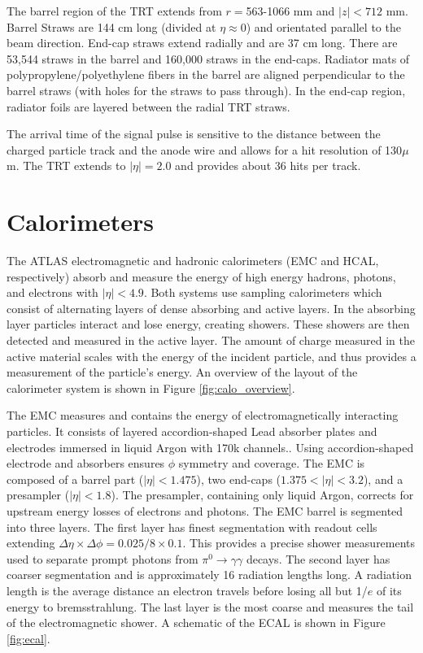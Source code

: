 The barrel region of the TRT extends from $r=$563-1066 mm and $|z| < 712$ mm. Barrel Straws are 144 cm long (divided  at $\eta \approx 0$) and orientated parallel to the beam direction. End-cap straws extend radially and are 37 cm long. There are 53,544 straws in the barrel and 160,000 straws in the end-caps. Radiator mats of polypropylene/polyethylene fibers in the barrel are aligned perpendicular to the barrel straws (with holes for the straws to pass through). In the end-cap region, radiator foils are layered between the radial TRT straws. 

The arrival time of the signal pulse is sensitive to the distance between the charged particle track and the anode wire and allows for a hit resolution of 130$\mu$m. The TRT extends to $|\eta| = 2.0$ and provides about 36 hits per track.
\section{Calorimeters}
The ATLAS electromagnetic and hadronic calorimeters (EMC and HCAL, respectively) absorb and measure the energy of high energy hadrons, photons, and electrons with $|\eta| < 4.9$. Both systems use sampling calorimeters which consist of alternating layers of dense absorbing and active layers. In the absorbing layer particles interact and lose energy, creating showers. These showers are then detected and measured in the active layer. The amount of charge measured in the active material scales with the energy of the incident particle, and thus provides a measurement of the particle's energy. An overview of the layout of the calorimeter system is shown in Figure \ref{fig:calo_overview}.

The EMC measures and contains the energy of electromagnetically interacting particles. It consists of layered accordion-shaped Lead absorber plates and electrodes immersed in liquid Argon with 170k channels.. Using accordion-shaped electrode and absorbers ensures $\phi$ symmetry and coverage. The EMC is composed of a barrel part ($|\eta| < 1.475$), two end-caps ($1.375<|\eta| < 3.2$), and a presampler ($|\eta| < 1.8$).  The presampler, containing only liquid Argon, corrects for upstream energy losses of electrons and photons. The EMC barrel is segmented into three layers. The first layer has finest segmentation with readout cells extending $\Delta \eta \times \Delta \phi = 0.025/8 \times 0.1$. This provides a precise shower measurements used to separate prompt photons from $\pi^{0} \rightarrow \gamma \gamma$ decays. The second layer has coarser segmentation and is approximately 16 radiation lengths long. A radiation length is the average distance an electron travels before losing all but 1/$e$ of its energy to bremsstrahlung. The last layer is the most coarse and measures the tail of the electromagnetic shower. A schematic of the ECAL is shown in Figure \ref{fig:ecal}. 

